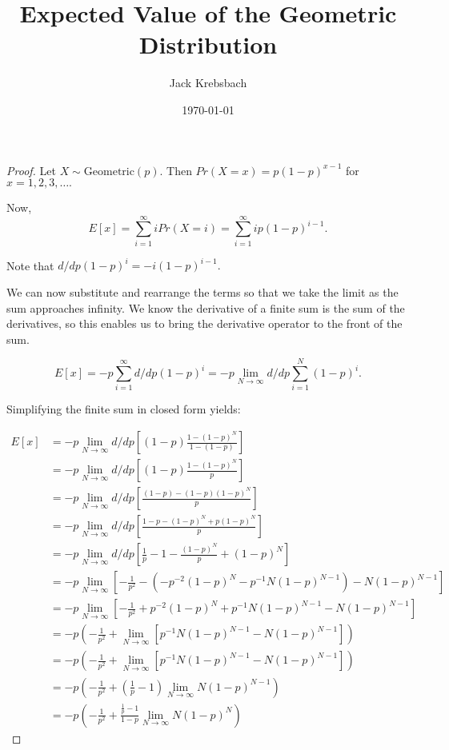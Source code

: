 \documentclass{report}
\title{Expected Value of the Geometric Distribution}
\author{Jack Krebsbach}
\date{\today}
\begin{document}
\maketitle


\begin{proof}

  Let $X \sim \text{Geometric}(p).$ Then $Pr(X =x) =  p(1-p)^{x-1}$ for $x = 1,2,3, \dots.$

\par

Now, 
$$ E[x] = \sum_{i=1}^{\infty} i Pr(X=i) =
\sum_{i=1}^{\infty} i p(1-p)^{i-1}.$$


Note that $d/dp (1-p)^i = -i(1-p)^{i-1}.$

We can now substitute and rearrange the terms so that we take the limit as the sum approaches infinity. We know the derivative of a finite sum is the sum of the derivatives, so this enables us to bring the derivative operator to the front of the sum.

$$ E[x] = -p\sum_{i=1}^{\infty} d/dp (1-p)^{i} = -p \lim_{N \rightarrow \infty}  d/dp \sum_{i=1}^{N}(1-p)^{i}.$$

Simplifying the finite sum in closed form yields:


\begin{align*}
  E[x] &= -p \lim_{N \rightarrow \infty}  d/dp \left[ (1-p)\frac{ 1 - (1-p)^{N}}{1 -(1-p)} \right]\\
  &= -p \lim_{N \rightarrow \infty}  d/dp \left[ (1-p)\frac{ 1 - (1-p)^{N}}{p} \right]\\
  &= -p \lim_{N \rightarrow \infty}  d/dp \left[ \frac{ (1-p) - (1-p)(1-p)^{N}}{p} \right]\\
  &= -p \lim_{N \rightarrow \infty}  d/dp \left[ \frac{ 1-p - (1-p)^{N}+p(1-p)^{N}}{p} \right]\\
  &= -p \lim_{N \rightarrow \infty}  d/dp \left[ \frac{1}{p} -1 - \frac{(1-p)^{N}}{p} +(1-p)^{N} \right]\\
  &= -p \lim_{N \rightarrow \infty} \left[ -\frac{1}{p^2} - \left(-p^{-2}(1-p)^N - p^{-1}N(1-p)^{N-1} \right) -N(1-p)^{N-1} \right]\\
  &= -p \lim_{N \rightarrow \infty} \left[ -\frac{1}{p^2}  +p^{-2}(1-p)^N + p^{-1}N(1-p)^{N-1}-N(1-p)^{N-1} \right]\\
  &= -p \left( -\frac{1}{p^2} + \lim_{N \rightarrow \infty} \left[p^{-1}N(1-p)^{N-1}-N(1-p)^{N-1} \right] \right)\\
  &= -p \left( -\frac{1}{p^2} + \lim_{N \rightarrow \infty} \left[p^{-1}N(1-p)^{N-1}-N(1-p)^{N-1} \right] \right)\\
  &= -p \left( -\frac{1}{p^2} + \left(\frac{1}{p}-1\right)\lim_{N \rightarrow \infty}N(1-p)^{N-1} \right)\\
  &= -p \left( -\frac{1}{p^2} + \frac{\frac{1}{p}-1}{1-p}\lim_{N \rightarrow \infty}N(1-p)^{N} \right)
\end{align*}


\end{proof}
\end{document}
